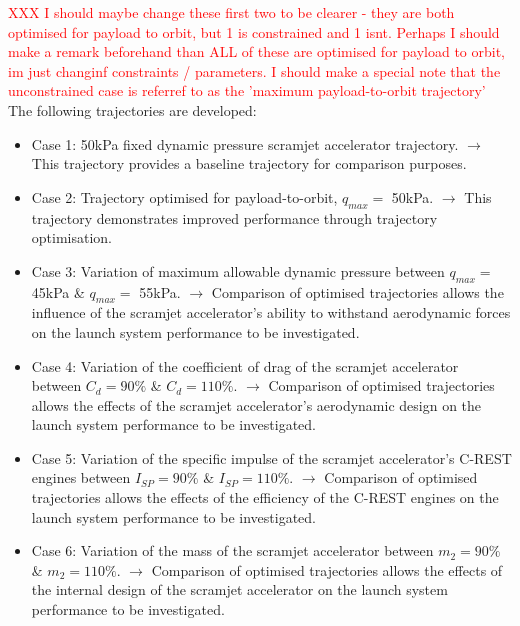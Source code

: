 \textcolor{red}{XXX I should maybe change these first two to be clearer - they are both optimised for payload to orbit, but 1 is constrained and 1 isnt. Perhaps I should make a remark beforehand than ALL of these are optimised for payload to orbit, im just changinf constraints / parameters. I should make a special note that the unconstrained case is referref to as the 'maximum payload-to-orbit trajectory'}
The following trajectories are developed: 
\begin{itemize}
	
	\item Case 1: 50kPa fixed dynamic pressure scramjet accelerator trajectory. \newline$\rightarrow$ This trajectory provides a baseline trajectory for comparison purposes.
	\item Case 2: Trajectory optimised for payload-to-orbit, $q_{max} = $ 50kPa. \newline$\rightarrow$ This trajectory demonstrates improved performance through trajectory optimisation.
	\item Case 3: Variation of maximum allowable dynamic pressure between $q_{max} = $ 45kPa \& $q_{max} = $ 55kPa. 
	\newline$\rightarrow$ Comparison of optimised trajectories allows the influence of the scramjet accelerator's ability to withstand aerodynamic forces on the launch system performance to be investigated.
	\item Case 4: Variation of the coefficient of drag of the scramjet accelerator between $C_d = 90\%$ \& $C_d = 110\%$. 
	\newline$\rightarrow$ Comparison of optimised trajectories allows the effects of the scramjet accelerator's aerodynamic design on the launch system performance to be investigated.
	\item Case 5: Variation of the specific impulse of the scramjet accelerator's C-REST engines between $I_{SP} = 90\%$ \& $I_{SP} = 110\%$. 
	\newline$\rightarrow$ Comparison of optimised trajectories allows the effects of the efficiency of the C-REST engines on the launch system performance to be investigated. 
	\item Case 6: Variation of the mass of the scramjet accelerator between $m_2 = 90\%$ \& $m_2 = 110\%$. 
	\newline$\rightarrow$ Comparison of optimised trajectories allows the effects of the internal design of the scramjet accelerator on the launch system performance to be investigated. 

\end{itemize}
